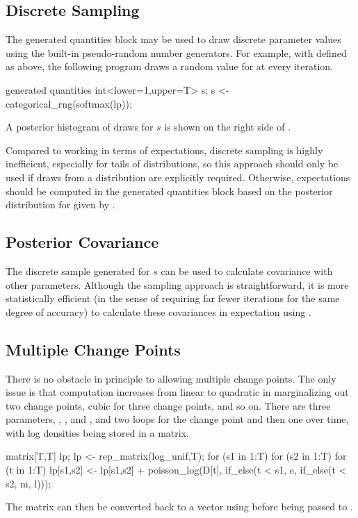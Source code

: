 %



\subsection{Discrete Sampling}

The generated quantities block may be used to draw discrete parameter
values using the built-in pseudo-random number generators.  For
example, with  defined as above, the following program
draws a random value for  at every iteration.
%
\begin{stancode}
generated quantities {
  int<lower=1,upper=T> s;
  s <- categorical_rng(softmax(lp));
}
\end{stancode}
%
A posterior histogram of draws for $s$ is shown on the right side of
.

Compared to working in terms of expectations, discrete sampling is
highly inefficient, especially for tails of distributions, so this
approach should only be used if draws from a distribution are
explicitly required.   Otherwise, expectations should be computed in
the generated quantities block based on the posterior distribution for
 given by .


\subsection{Posterior Covariance}

The discrete sample generated for $s$ can be used to calculate
covariance with other parameters.  Although the sampling approach is
straightforward, it is more statistically efficient (in the sense of
requiring far fewer iterations for the same degree of accuracy) to
calculate these covariances in expectation using .


\subsection{Multiple Change Points}

There is no obstacle in principle to allowing multiple change points.
The only issue is that computation increases from linear to quadratic
in marginalizing out two change points, cubic for three change points,
and so on.  There are three parameters, , , and
, and two loops for the change point and then one over time,
with log densities being stored in a matrix.
%
\begin{stancode}
matrix[T,T] lp;
lp <- rep_matrix(log_unif,T);
for (s1 in 1:T)
  for (s2 in 1:T)
    for (t in 1:T)
      lp[s1,s2] <- lp[s1,s2] 
        + poisson_log(D[t], if_else(t < s1, e, if_else(t < s2, m, l)));
\end{stancode}
%
The matrix can then be converted back to a vector using
 before being passed to .

